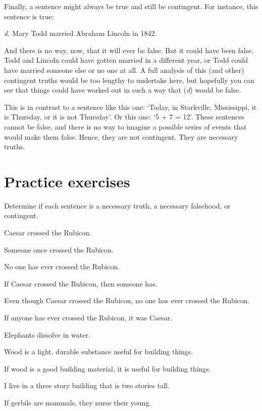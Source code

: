 Finally, a sentence might always be true and still be contingent. For instance, this sentence is true: 
	\begin{earg}
		\item[\textit{d.}] Mary Todd married Abraham Lincoln in 1842. 
	\end{earg}
And there is no way, now, that it will ever be false. But it could have been false. Todd and Lincoln could have gotten married in a different  year, or Todd could have married someone else or no one at all. A full analysis of this (and other) contingent truths would be too lengthy to undertake here, but hopefully you can see that things could have worked out in such a way that (\textit{d}) would be false. 

This is in contrast to a sentence like this one: `Today, in Starkville, Mississippi, it is Thursday, or it is not Thursday'. Or this one: `5 + 7 = 12'. These sentences cannot be false, and there is no way to imagine a possible series of events that would make them false. Hence, they are not contingent. They are necessary truths.    



\section{Practice exercises}
\setcounter{ProbPart}{0}

\problempart
\label{pr.EnglishTautology2}
Determine if each sentence is a necessary truth, a necessary falsehood, or contingent.
\begin{earg}
\item Caesar crossed the Rubicon.
\item Someone once crossed the Rubicon.
\item No one has ever crossed the Rubicon.
\item If Caesar crossed the Rubicon, then someone has.
\item Even though Caesar crossed the Rubicon, no one has ever crossed the Rubicon.
\item If anyone has ever crossed the Rubicon, it was Caesar.

\item Elephants dissolve in water.
\item Wood is a light, durable substance useful for building things.
\item If wood is a good building material, it is useful for building things.
\item I live in a three story building that is two stories tall.
\item If gerbils are mammals, they nurse their young.
\end{earg}

